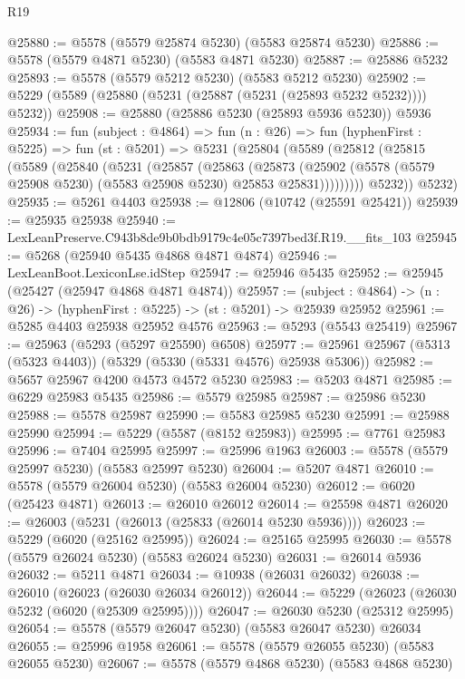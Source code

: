 \begin{lexlean}{R19}
\begin{coremodule}
@25880 := @5578 (@5579 @25874 @5230) (@5583 @25874 @5230)
@25886 := @5578 (@5579 @4871 @5230) (@5583 @4871 @5230)
@25887 := @25886 @5232
@25893 := @5578 (@5579 @5212 @5230) (@5583 @5212 @5230)
@25902 := @5229 (@5589 (@25880 (@5231 (@25887 (@5231 (@25893 @5232 @5232)))) @5232))
@25908 := @25880 (@25886 @5230 (@25893 @5936 @5230)) @5936
@25934 := fun (subject : @4864) =>
  fun (n : @26) =>
  fun (hyphenFirst : @5225) =>
  fun (st : @5201) =>
  @5231
    (@25804
      (@5589
        (@25812
          (@25815
            (@5589
              (@25840
                (@5231
                  (@25857
                    (@25863
                      (@25873
                        (@25902
                          (@5578 (@5579 @25908 @5230) (@5583 @25908 @5230) @25853 @25831)))))))))
          @5232))
      @5232)
@25935 := @5261 @4403
@25938 := @12806 (@10742 (@25591 @25421))
@25939 := @25935 @25938
@25940 := LexLeanPreserve.C943b8de9b0bdb9179c4e05c7397bed3f.R19.__fits_103
@25945 := @5268 (@25940 @5435 @4868 @4871 @4874)
@25946 := LexLeanBoot.LexiconLse.idStep
@25947 := @25946 @5435
@25952 := @25945 (@25427 (@25947 @4868 @4871 @4874))
@25957 := (subject : @4864) -> (n : @26) -> (hyphenFirst : @5225) -> (st : @5201) -> @25939 @25952
@25961 := @5285 @4403 @25938 @25952 @4576
@25963 := @5293 (@5543 @25419)
@25967 := @25963 (@5293 (@5297 @25590) @6508)
@25977 := @25961 @25967 (@5313 (@5323 @4403)) (@5329 (@5330 (@5331 @4576) @25938 @5306))
@25982 := @5657 @25967 @4200 @4573 @4572 @5230
@25983 := @5203 @4871
@25985 := @6229 @25983 @5435
@25986 := @5579 @25985
@25987 := @25986 @5230
@25988 := @5578 @25987
@25990 := @5583 @25985 @5230
@25991 := @25988 @25990
@25994 := @5229 (@5587 (@8152 @25983))
@25995 := @7761 @25983
@25996 := @7404 @25995
@25997 := @25996 @1963
@26003 := @5578 (@5579 @25997 @5230) (@5583 @25997 @5230)
@26004 := @5207 @4871
@26010 := @5578 (@5579 @26004 @5230) (@5583 @26004 @5230)
@26012 := @6020 (@25423 @4871)
@26013 := @26010 @26012
@26014 := @25598 @4871
@26020 := @26003 (@5231 (@26013 (@25833 (@26014 @5230 @5936))))
@26023 := @5229 (@6020 (@25162 @25995))
@26024 := @25165 @25995
@26030 := @5578 (@5579 @26024 @5230) (@5583 @26024 @5230)
@26031 := @26014 @5936
@26032 := @5211 @4871
@26034 := @10938 (@26031 @26032)
@26038 := @26010 (@26023 (@26030 @26034 @26012))
@26044 := @5229 (@26023 (@26030 @5232 (@6020 (@25309 @25995))))
@26047 := @26030 @5230 (@25312 @25995)
@26054 := @5578 (@5579 @26047 @5230) (@5583 @26047 @5230) @26034
@26055 := @25996 @1958
@26061 := @5578 (@5579 @26055 @5230) (@5583 @26055 @5230)
@26067 := @5578 (@5579 @4868 @5230) (@5583 @4868 @5230)

\end{coremodule}
\end{lexlean}
